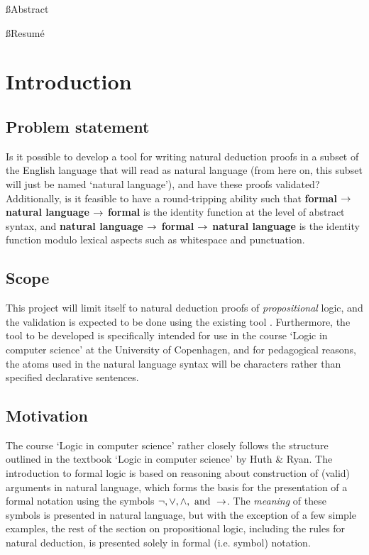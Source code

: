 \documentclass[a4paper]{article}
\title{\tit}
\begin{document}
\begin{titlepage}
\maketitle
\thispagestyle{empty}
\end{titlepage}

\tableofcontents
\thispagestyle{empty}
\pagebreak
{}

\ss{Abstract}

\ss{Resumé}

\section{Introduction}
\subsection{Problem statement}
    Is it possible to develop a tool for writing natural deduction proofs
    in a subset of the English language that will read as natural language
    (from here on, this subset will just be named `natural language'),
    and have these proofs validated? Additionally, is it feasible to have
    a round-tripping ability such that {\bf formal $\rightarrow$ natural language
    $\rightarrow$ formal} is the identity function at the level of abstract syntax,
    and {\bf natural language $\rightarrow$ formal $\rightarrow$ natural language} is the
    identity function modulo lexical aspects such as whitespace and
    punctuation.

\subsection{Scope}
    This project will limit itself to natural deduction proofs of
    \emph{propositional} logic, and the validation is expected to be done
    using the existing tool \cite{box}. Furthermore, the tool
    to be developed is specifically intended for use in the course `Logic
    in computer science' at the University of Copenhagen, and for  
    pedagogical reasons, the atoms used in the natural language syntax
    will be characters rather than specified declarative sentences.

\subsection{Motivation}
    The course `Logic in computer science' rather closely follows the 
    structure outlined in the textbook `Logic in computer science' by
    Huth \& Ryan\cite{hr}. The introduction to formal logic is based on
    reasoning about construction of (valid) arguments in natural 
    language\cite[pp.~1-2]{hr}, which forms the basis for the presentation
    of a formal notation using the symbols 
    \(\neg, \lor, \land, \textnormal{ and } \rightarrow\)\cite[p.~4]{hr}. 
    The \emph{meaning} of these symbols is presented in natural language,
    but with the exception of a few simple examples, the rest of the section 
    on propositional logic, including the rules for natural deduction,
    is presented solely in formal (i.e. symbol) notation.
\end{document}
